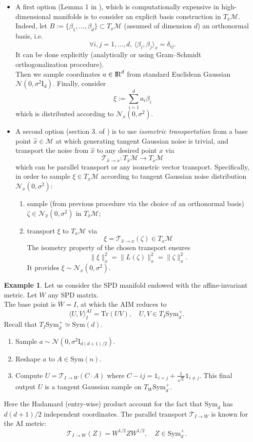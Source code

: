 \documentclass[10pt,a4paper]{book}
\theoremstyle{definition}
\newtheorem{exm}{Example}[section]
\theoremstyle{plain}
\theoremstyle{remark}
\newcommand \M {\mathcal{M}}
\def\R{{\rm I\kern-0.16em R}}
\begin{document}
\begin{itemize}
\item A first option (Lemma 1 in \cite{utpala2022improved}), which is computationally expensive in high-dimensional manifolds is to consider an explicit basis construction in $T_x\M$. Indeed, let $B:=\{\beta_1,\dots,\beta_d\}\subset T_x\M$ (assumed of dimension $d$) an orthonormal basis, i.e.
$$\forall i,j =1,\dots, d,~\langle \beta_i,\beta_j\rangle_{x}=\delta_{ij}.$$
It can be done explicitly (analytically or using Gram--Schmidt orthogonalization procedure). \\
 Then we sample coordinates $a\in \R^d$ from standard Euclidean Gaussian $\mathcal{N}(0,\sigma^2\text{I}_d)$. Finally, consider 
$$\xi:=\sum_{i=1}^{d}a_i\beta_i$$
which is distributed according to $\mathcal{N}_x(0,\sigma^2)$.
\item A second option (section 3. of \cite{utpala2022improved})  is to use \emph{isometric transportation} from a base point $\hat{x} \in \M$ at which generating tangent Gaussian noise is trivial, and transport the noise from $\hat{x}$ to any desired point $x$ via
$$\mathcal{T}_{\hat{x}\to x}:T_{\hat{x}}\M \to T_x\M$$
which can be parallel transport or any isometric vector transport. Specifically, in order to sample $\xi \in T_x\M$ according to tangent Gaussian noise distribution $\mathcal{N}_x(0,\sigma^2)$:
\begin{enumerate}
\item sample (from previous procedure via the choice of an orthonormal basis) $\zeta \in \mathcal{N}_{\hat{x}}(0,\sigma^2)$ in $T_{\hat{x}}\M$;
\item transport $\xi$ to $T_x\M$ via
$$\xi=\mathcal{T}_{\hat{x}\to x}(\zeta)\in T_x\M$$
The isometry property of the chosen transport ensures
$$\|\xi\|_{x}^{2}=\|L(\zeta)\|^2_{x}=\|\zeta\|^{2}_{x}.$$
It provides $\xi\sim \mathcal{N}_{x}(0,\sigma^2)$. 
\end{enumerate}
\end{itemize}
\begin{exm}
Let us consider the SPD manifold endowed with the affine-invariant metric. Let $W$ any SPD matrix. \\The base point is $\bar{W}= I$, at which the AIM reduces to
$$\langle U,V\rangle_{I}^{AI}=\text{Tr}(UV), \quad U,V \in T_{I}\text{Sym}_d^{+}.$$
Recall that $T_{I}\text{Sym}_d^{+}\simeq \text{Sym}(d)$.
\begin{enumerate}
\item Sample $a\sim \mathcal{N}(0,\sigma^2\text{I}_{d(d+1)/2})$.
\item Reshape $a$ to $A \in \text{Sym}(n)$.
\item Compute $U=\mathcal{T}_{I\to W}(C \cdot A)$ where $C-{ij}=\mathds{1}_{i=j}+\frac{1}{\sqrt{2}}\mathds{1}_{i\neq j}$. This final output $U$ is a tangent Gaussian sample on $T_W \text{Sym}_d^{+}$.
\end{enumerate}
Here the Hadamard (entry-wise) product account for the fact that $\text{Sym}_d$ has $d(d+1)/2$ independent coordinates. The parallel transport $\mathcal{T}_{I\to W}$ is known for the AI metric:
$$\mathcal{T}_{I\to W}(Z)=W^{1/2}ZW^{1/2}, \quad Z\in \text{Sym}_d^{+}.$$
\end{exm}
\end{document}
